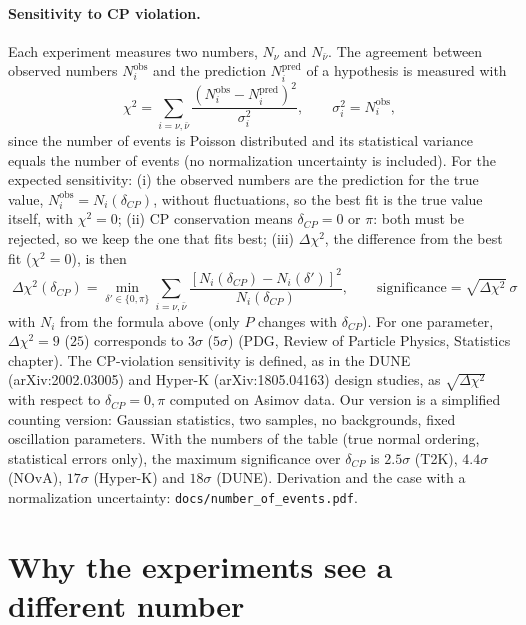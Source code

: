 \documentclass[11pt,a4paper]{article}
\begin{document}
\paragraph{Sensitivity to CP violation.}
Each experiment measures two numbers, $N_\nu$ and $N_{\bar\nu}$. The agreement between observed numbers
$N_i^\text{obs}$ and the prediction $N_i^\text{pred}$ of a hypothesis is measured with
\begin{equation*}
  \chi^2 = \sum_{i=\nu,\bar\nu} \frac{\left(N_i^\text{obs} - N_i^\text{pred}\right)^2}{\sigma_i^2},
  \qquad \sigma_i^2 = N_i^\text{obs},
\end{equation*}
since the number of events is Poisson distributed and its statistical variance equals the number of events
(no normalization uncertainty is included). For the expected sensitivity:
(i) the observed numbers are the prediction for the true value, $N_i^\text{obs} = N_i(\delta_{CP})$, without
fluctuations, so the best fit is the true value itself, with $\chi^2 = 0$;
(ii) CP conservation means $\delta_{CP} = 0$ or $\pi$: both must be rejected, so we keep the one that fits best;
(iii) $\Delta\chi^2$, the difference from the best fit ($\chi^2=0$), is then
\begin{equation*}
  \boxed{\;\Delta\chi^2(\delta_{CP}) = \min_{\delta'\in\{0,\pi\}} \sum_{i=\nu,\bar\nu}
  \frac{\left[N_i(\delta_{CP}) - N_i(\delta')\right]^2}{N_i(\delta_{CP})},
  \qquad \text{significance} = \sqrt{\Delta\chi^2}\ \sigma\;}
\end{equation*}
with $N_i$ from the formula above (only $P$ changes with $\delta_{CP}$). For one parameter, $\Delta\chi^2 = 9$ ($25$)
corresponds to $3\sigma$ ($5\sigma$) (PDG, Review of Particle Physics, Statistics chapter).
The CP-violation sensitivity is defined, as in the DUNE (arXiv:2002.03005) and Hyper-K (arXiv:1805.04163) design studies,
as $\sqrt{\Delta\chi^2}$ with respect to $\delta_{CP} = 0, \pi$ computed on Asimov data. Our version is a simplified
counting version: Gaussian statistics, two samples, no backgrounds, fixed oscillation parameters.
With the numbers of the table (true normal ordering, statistical errors only), the maximum significance over
$\delta_{CP}$ is $2.5\sigma$ (T2K), $4.4\sigma$ (NOvA), $17\sigma$ (Hyper-K) and $18\sigma$ (DUNE).
Derivation and the case with a normalization uncertainty: \texttt{docs/number\_of\_events.pdf}.

\section*{Why the experiments see a different number}
\label{sec:r}
\end{document}
